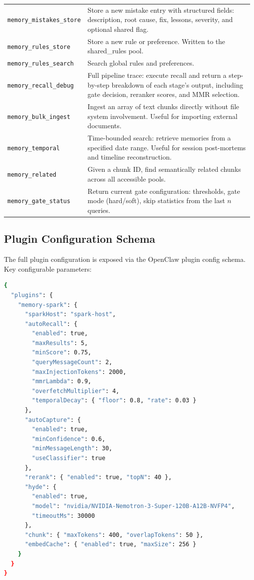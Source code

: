 \documentclass[11pt]{article}
\begin{document}
\begin{longtable}{lp{9cm}}
\texttt{memory\_mistakes\_store} & Store a new mistake entry with structured fields:
  description, root cause, fix, lessons, severity, and optional shared flag. \\[4pt]
\texttt{memory\_rules\_store} & Store a new rule or preference. Written to the
  shared\_rules pool. \\[4pt]
\texttt{memory\_rules\_search} & Search global rules and preferences. \\[4pt]
\texttt{memory\_recall\_debug} & Full pipeline trace: execute recall and return a step-by-step
  breakdown of each stage's output, including gate decision, reranker scores, and
  MMR selection. \\[4pt]
\texttt{memory\_bulk\_ingest} & Ingest an array of text chunks directly without file
  system involvement. Useful for importing external documents. \\[4pt]
\texttt{memory\_temporal} & Time-bounded search: retrieve memories from a specified
  date range. Useful for session post-mortems and timeline reconstruction. \\[4pt]
\texttt{memory\_related} & Given a chunk ID, find semantically related chunks across
  all accessible pools. \\[4pt]
\texttt{memory\_gate\_status} & Return current gate configuration: thresholds, gate
  mode (hard/soft), skip statistics from the last $n$ queries. \\
\bottomrule
\end{longtable}

\subsection{Plugin Configuration Schema}

The full plugin configuration is exposed via the OpenClaw plugin config schema. Key
configurable parameters:

\begin{lstlisting}[language=bash, caption={Representative plugin configuration}]
{
  "plugins": {
    "memory-spark": {
      "sparkHost": "spark-host",
      "autoRecall": {
        "enabled": true,
        "maxResults": 5,
        "minScore": 0.75,
        "queryMessageCount": 2,
        "maxInjectionTokens": 2000,
        "mmrLambda": 0.9,
        "overfetchMultiplier": 4,
        "temporalDecay": { "floor": 0.8, "rate": 0.03 }
      },
      "autoCapture": {
        "enabled": true,
        "minConfidence": 0.6,
        "minMessageLength": 30,
        "useClassifier": true
      },
      "rerank": { "enabled": true, "topN": 40 },
      "hyde": {
        "enabled": true,
        "model": "nvidia/NVIDIA-Nemotron-3-Super-120B-A12B-NVFP4",
        "timeoutMs": 30000
      },
      "chunk": { "maxTokens": 400, "overlapTokens": 50 },
      "embedCache": { "enabled": true, "maxSize": 256 }
    }
  }
}
\end{lstlisting}
\end{document}
